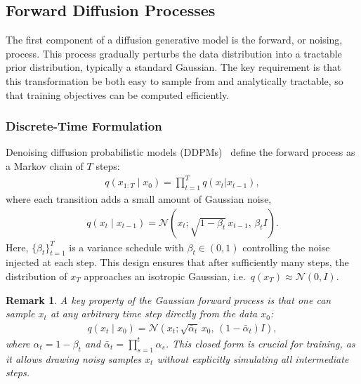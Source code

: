 \documentclass[a4paper,12pt]{article}
\newtheorem{remark}{Remark}[section]
\begin{document}
\subsection{Forward Diffusion Processes}
The first component of a diffusion generative model is the forward, or noising, process. 
This process gradually perturbs the data distribution into a tractable prior distribution, typically a standard Gaussian. The key requirement is that this transformation be both easy to sample from and analytically tractable, so that training objectives can be computed efficiently. 

\subsubsection{Discrete-Time Formulation}
Denoising diffusion probabilistic models (DDPMs)~\cite{hoDenoisingDiffusionProbabilistic2020} define the forward process as a Markov chain of \(T\) steps:
\begin{align*}
    q\left(x_{1:T}\mid x_0\right)=\prod_{t=1}^{T}q\left(x_t|x_{t-1}\right),
\end{align*}
where each transition adds a small amount of Gaussian noise,
\begin{align*}
    q\left(x_t \mid x_{t-1}\right) = \mathcal{N}\!\left(x_t ; \sqrt{1-\beta_t}\,x_{t-1}, \, \beta_t I \right).
\end{align*}
Here, \(\{\beta_t\}_{t=1}^T\) is a variance schedule with \(\beta_t \in (0,1)\) controlling the noise injected at each step. 
This design ensures that after sufficiently many steps, the distribution of \(x_T\) approaches an isotropic Gaussian, i.e.~\(q(x_T) \approx \mathcal{N}(0,I)\).
\begin{remark}
    A key property of the Gaussian forward process is that one can sample \(x_t\) at any arbitrary time step directly from the data \(x_0\):
    \begin{align*}
        q\left(x_t \mid x_0\right) = \mathcal{N}\!\left(x_t ; \sqrt{\bar \alpha_t}\,x_0, \,(1-\bar \alpha_t) I \right),
    \end{align*}
    where \(\alpha_t = 1 - \beta_t\) and \(\bar \alpha_t = \prod_{s=1}^t \alpha_s\). This closed form is crucial for training, as it allows drawing noisy samples \(x_t\) without explicitly simulating all intermediate steps.
\end{remark}
\end{document}
